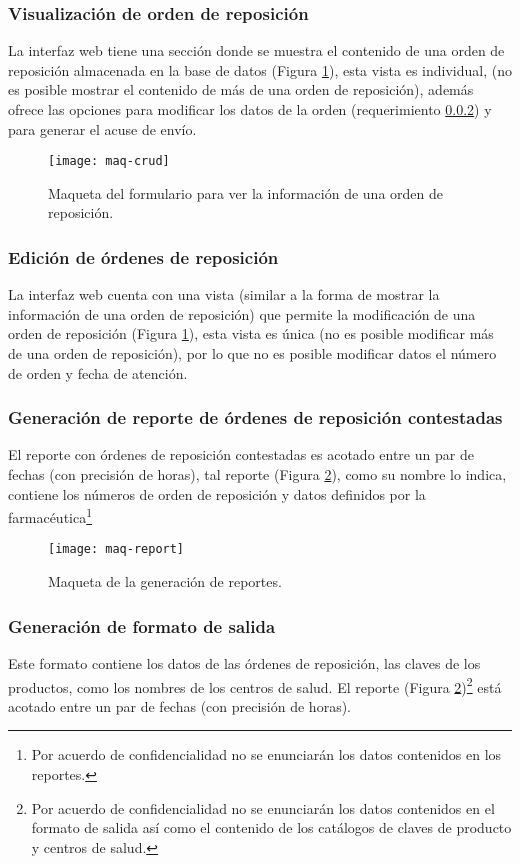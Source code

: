\subsubsection{Visualización de orden de reposición}\label{sec:req-show}
La interfaz web tiene una sección donde se muestra el contenido de una orden de reposición almacenada en la base de datos (Figura \ref{fig:maq-crud}), esta vista es individual, (no es posible mostrar el contenido de más de una orden de reposición), además ofrece las opciones para modificar los datos de la orden (requerimiento \ref{sec:req-update}) y para generar el acuse de envío.
\begin{figure}[h]
  \centering
  \texttt{[image: maq-crud]} 
  \caption{Maqueta del formulario para ver la información de una orden de reposición.}
  \label{fig:maq-crud}
\end{figure} 

\subsubsection{Edición de órdenes de reposición}\label{sec:req-update}
La interfaz web cuenta con una vista (similar a la forma de mostrar la información de una orden de reposición) que permite la modificación de una orden de reposición (Figura \ref{fig:maq-crud}), esta vista es única (no es posible modificar más de una orden de reposición), por lo que no es posible modificar datos el número de orden y fecha de atención.

\subsubsection{Generación de reporte de órdenes de reposición contestadas}\label{sec:req-rep-contestadas}
El reporte con órdenes de reposición contestadas es acotado entre un par de fechas (con precisión de horas), tal reporte (Figura \ref{fig:maq-report}), como su nombre lo indica, contiene los números de orden de reposición y datos definidos por la farmacéutica\footnote{Por acuerdo de confidencialidad no se enunciarán los datos contenidos en los reportes.}
\begin{figure}[h]
  \centering
  \texttt{[image: maq-report]} 
  \caption{Maqueta de la generación de reportes.}
  \label{fig:maq-report}
\end{figure} 

\subsubsection{Generación de formato de salida}\label{sec:req-rep-layout}
Este formato contiene los datos de las órdenes de reposición, las claves de los productos, como los nombres de los centros de salud. El reporte (Figura \ref{fig:maq-report})\footnote{Por acuerdo de confidencialidad no se enunciarán los datos contenidos en el formato de salida así como el contenido de los catálogos de claves de producto y centros de salud.} está acotado entre un par de fechas (con precisión de horas).

